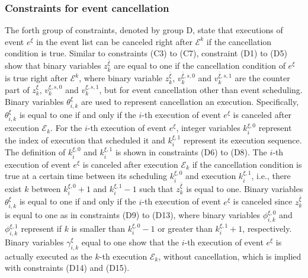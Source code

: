 \documentclass[]{interact}
\theoremstyle{plain}%
\theoremstyle{definition}
\theoremstyle{remark}
\begin{document}
\subsubsection{Constraints for event cancellation}
The forth group of constraints, denoted by group D, state that executions of event $e^{\xi}$ in the event list can be canceled right after $\mathcal{E}^k$ if the cancellation condition is true. Similar to constraints (C3) to (C7), constraint (D1) to (D5) show that binary variables $z^{\bar{\xi}}_{k}$ are equal to one if the cancellation condition of $e^{\xi}$ is true right after $\mathcal{E}^k$, where binary variable $z^{\bar{\xi}}_{k}$, $v^{\bar{\xi},s,0}_k$ and $v^{\bar{\xi},s,1}_k$ are the counter part of $z^{\xi}_{k}$, $v^{\xi,s,0}_k$ and $v^{\xi,s,1}_k$, but for event cancellation other than event scheduling. Binary variables $\theta^{\xi}_{i,k}$ are used to represent cancellation an execution. Specifically, $\theta^{\xi}_{i,k}$ is equal to one if and only if the $i$-th execution of event $e^{\xi}$ is canceled after execution $\mathcal{E}_k$. For the $i$-th execution of event $e^{\xi}$, integer variables $k^{\xi,0}_i$ represent the index of execution that scheduled it and $k^{\xi,1}_i$ represent its execution sequence. The definition of $k^{\xi,0}_i$ and $k^{\xi,1}_i$ is shown in constraints (D6) to (D8). The $i$-th execution of event $e^{\xi}$ is canceled after execution $\mathcal{E}_k$ if the cancellation condition is true at a certain time between its scheduling $k^{\xi,0}_i$ and execution $k^{\xi,1}_i$, i.e., there exist $k$ between $k^{\xi,0}_i+1$ and $k^{\xi,1}_i-1$ such that $z^{\bar{\xi}}_{k}$ is equal to one. Binary variables $\theta^{\xi}_{i,k}$ is equal to one if and only if the $i$-th execution of event $e^{\xi}$ is canceled since $z^{\bar{\xi}}_{k}$ is equal to one as in constraints (D9) to (D13), where binary variables $\phi^{\xi,0}_{i,k}$ and $\phi^{\xi,1}_{i,k}$ represent if $k$ is smaller than $k^{\xi,0}_i-1$ or greater than $k^{\xi,1}_i+1$, respectively. Binary variables $\gamma^{\xi}_{i,k}$ equal to one show that the $i$-th execution of event $e^{\xi}$ is actually executed as the $k$-th execution $\mathcal{E}_k$, without cancellation, which is implied with constraints (D14) and (D15).
\end{document}
